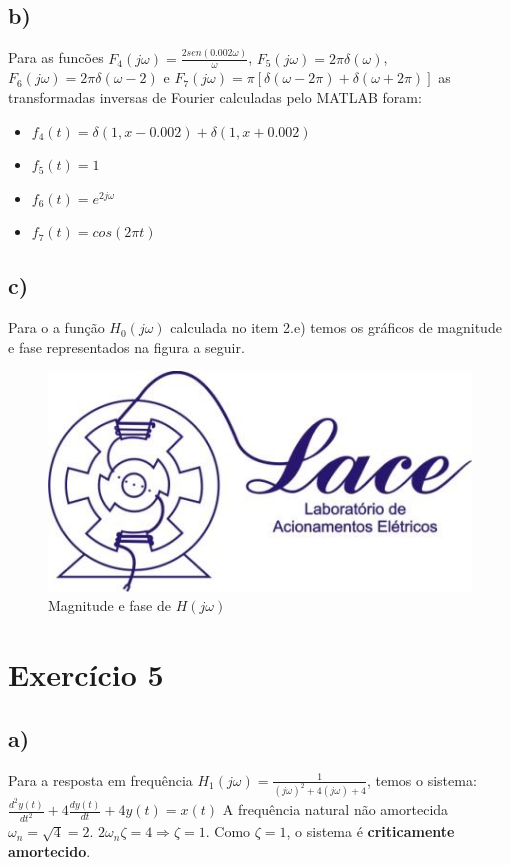 \documentclass[a4paper,12pt,oneside,openany,table,xcdraw]{article}
\begin{document}
\subsection{b)}
Para as funcões $F_4(j\omega)=\frac{2sen(0.002\omega)}{\omega}$, $F_5(j\omega)=2 \pi \delta(\omega)$, $F_6(j\omega)=2 \pi \delta(\omega-2)$ e $F_7(j\omega)=\pi[\delta(\omega-2 \pi)+\delta(\omega+2 \pi)]$ as transformadas inversas de Fourier calculadas pelo MATLAB foram:
\begin{itemize}
    \item $f_4(t)= \delta(1,x-0.002) + \delta(1,x+0.002)$
    \item $f_5(t)=1$
    \item $f_6(t)=e^{2j\omega}$
    \item $f_7(t)=cos(2 \pi t)$
\end{itemize}

\subsection{c)}

Para o a função $H_0(j \omega)$ calculada no item 2.e) temos os gráficos de magnitude e fase representados na figura a seguir.
\begin{figure}[H]
    \centering
    \includegraphics[width = 0.85 \textwidth]{a}
    \caption{Magnitude e fase de $H(j \omega)$}
    \label{fig:my_label}
\end{figure}

\section{Exercício 5}
\subsection{a)} 
Para a resposta em frequência $H_1(j\omega)=\frac{1}{(j\omega)^2+4(j\omega)+4}$, temos o sistema:\\ $\frac{d^2y(t)}{dt^2}+4\frac{dy(t)}{dt}+4y(t)=x(t)$
\newline \newline
A frequência natural não amortecida $\omega_n = \sqrt{4} = 2$.
\newline
$2\omega_n\zeta=4 \Longrightarrow \zeta = 1$. Como $\zeta=1$, o sistema é \textbf{criticamente amortecido}.\newline \newline
\end{document}
